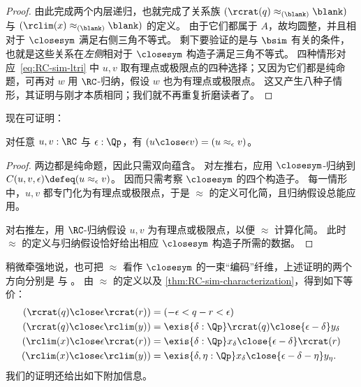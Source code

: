 \begin{proof}
  由此完成两个内层递归，也就完成了关系族 $(\rcrat(q)\approx_{(\blank)}\blank)$ 与 $(\rclim(x)\approx_{(\blank)}\blank)$ 的定义。
  由于它们都属于 $A$，故均圆整，并且相对于 $\closesym$ 满足右侧三角不等式。
  剩下要验证的是与 $\bsim$ 有关的条件，也就是这些关系在\emph{左侧}相对于 $\closesym$ 构造子满足三角不等式。
  四种情形对应~\eqref{eq:RC-sim-ltri} 中 $u,v$ 取有理点或极限点的四种选择；又因为它们都是纯命题，可再对 $w$ 用 $\RC$-归纳，假设 $w$ 也为有理点或极限点。
  这又产生八种子情形，其证明与刚才本质相同；我们就不再重复折磨读者了。
\end{proof}

现在可证明：

\begin{thm}\label{thm:RC-sim-characterization}
  对任意 $u,v:\RC$ 与 $\epsilon:\Qp$，有 $(u\close\epsilon v) = (u\approx_\epsilon v)$。
\end{thm}
\begin{proof}
  两边都是纯命题，因此只需双向蕴含。
  对左推右，应用 $\closesym$-归纳到 $C(u,v,\epsilon)\defeq (u\approx_\epsilon v)$。
  因而只需考察 $\closesym$ 的四个构造子。
  每一情形中，$u,v$ 都专门化为有理点或极限点，于是 $\approx$ 的定义可化简，且归纳假设总能应用。

  对右推左，用 $\RC$-归纳假设 $u,v$ 为有理点或极限点，以便 $\approx$ 计算化简。
  此时 $\approx$ 的定义与归纳假设恰好给出相应 $\closesym$ 构造子所需的数据。
\end{proof}

%
稍微牵强地说，也可把 $\approx$ 看作 $\closesym$ 的一束“编码”纤维，上述证明的两个方向分别是 \encode 与 \decode。
由 $\approx$ 的定义以及 \cref{thm:RC-sim-characterization}，得到如下等价：
\begin{align*}
  (\rcrat(q) \close\epsilon \rcrat(r))  &=
  (-\epsilon < q - r < \epsilon)\\
  (\rcrat(q) \close\epsilon \rclim(y)) &=
  \exis{\delta : \Qp} \rcrat(q) \close{\epsilon - \delta} y_\delta\\
  (\rclim(x) \close\epsilon \rcrat(r)) &=
  \exis{\delta : \Qp} x_\delta \close{\epsilon - \delta} \rcrat(r)\\
  (\rclim(x) \close\epsilon \rclim(y)) &=
  \exis{\delta, \eta : \Qp} x_\delta \close{\epsilon - \delta - \eta} y_\eta.
\end{align*}
我们的证明还给出如下附加信息。

